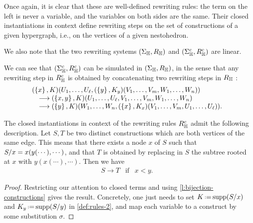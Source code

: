 Once again, it is clear that these are well-defined rewriting rules: the term on the left is never a variable, and the variables on both sides are the same.
Their closed instantiations in context define rewriting steps on the set of constructions of a given hypergraph, i.e., on the vertices of a given nestohedron.  

We also note that the two rewriting systems $(\Sigma_{\mathbb H},R_{\mathbb H})$ and $(\Sigma_{\mathbb H}^c,R_{\mathbb H}^c)$ are linear.

\begin{remark} \label{consruction-join-constructs}
We can see that $(\Sigma_{\mathbb H}^c,R_{\mathbb H}^c)$ can be simulated in $(\Sigma_{\mathbb H},R_{\mathbb H})$, in the sense that any rewriting step in $R_{\mathbb H}^c$ is obtained by concatenating two rewriting steps in $R_{\mathbb H}$ :
 $$\begin{array}{l}(\left\{x\right\},K)(U_1,\ldots, U_{\ell},(\left\{y\right\},K_y)(V_1,\ldots,V_m,W_1,\ldots,W_n))\\
 \quad  \longrightarrow (\left\{x,y\right\},K)(U_1,\ldots,U_\ell,V_1,\ldots,V_m,W_1,\ldots,W_n)\\
 \quad
 \longrightarrow (\left\{y\right\},K)(W_1,\ldots,W_n,(\left\{x\right\},K_x)(V_1,\ldots,V_m,U_1,\ldots,U_\ell)).
 \end{array}$$
\end{remark}

\begin{lemma} 
  \label{l:instantiation-constructions}
  The closed instantiations in context of the rewriting rules $R_{\mathbb H}^c$ admit the following description.
  Let $S,T$ be two distinct constructions which are both vertices of the same edge. 
  This means that there exists a node $x$ of $S$ such that $S/x=x(y(\cdots),\cdots)$, and that $T$ is obtained by replacing in $S$ the  subtree rooted at $x$ with $y(x(\cdots),\cdots)$. 
  Then we have
  $$\begin{array}{lll}
    S \to T &  \mathrm{if} & x < y. 
  \end{array}$$
\end{lemma} 

\begin{proof}
  Restricting our attention to closed terms and using \cref{l:bijection-constructions} gives the result. 
  Concretely, one just needs to set $K\eqdef \supp(\occ{S}{x})$ and $K_y\eqdef \supp(\occ{S}{y})$ in \cref{def:rules-2}, and map each variable to a construct by some substitution $\sigma$.
\end{proof}

